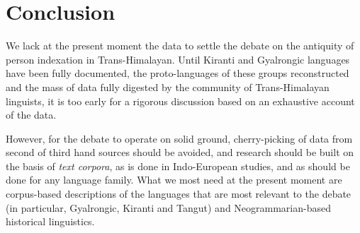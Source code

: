\documentclass[oldfontcommands,oneside,a4paper,11pt]{article}
\begin{document}
\section{Conclusion}

We lack at the present moment the data to settle the debate on the antiquity of person indexation in Trans-Himalayan. Until Kiranti and Gyalrongic languages have been fully documented, the proto-languages of these groups reconstructed and the mass of data fully digested by the community of Trans-Himalayan linguists, it is too early for a rigorous discussion based on an exhaustive account of the data. 


However,  for the debate to operate on solid ground, cherry-picking of data from second of third hand sources should be avoided, and research should be built on the basis of \textit{text corpora}, as is done in Indo-European studies, and as should be done for any language family. What we most need at the present moment are corpus-based descriptions of the languages that are most relevant to the debate (in particular, Gyalrongic, Kiranti and Tangut) and Neogrammarian-based historical linguistics.

\charis


\end{document}
